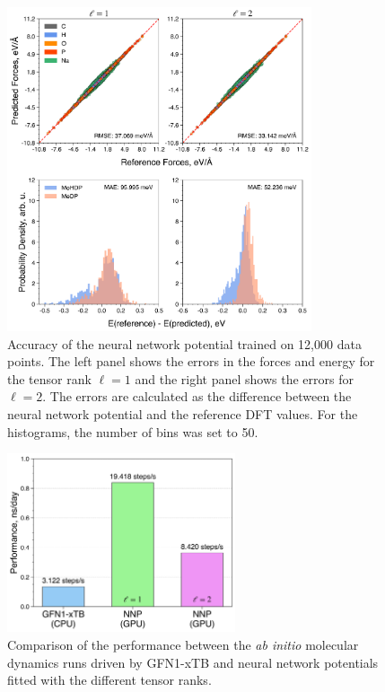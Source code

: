 \begin{figure}[ht]
    \centering
    \includegraphics[width=0.8\textwidth]{Figures/4_Results/results_nnp_accuracy_l-1_l-2.png}
    \caption{Accuracy of the neural network potential trained on 12,000 data points. The left panel shows the errors in the forces and energy for the tensor rank $\ell=1$ and the right panel shows the errors for $\ell=2$. The errors are calculated as the difference between the neural network potential and the reference DFT values. For the histograms, the number of bins was set to 50.}
    \label{fig:nnp_accuracy}
\end{figure}

\begin{figure}[ht]
    \centering
    \includegraphics[width=0.6\textwidth]{Figures/4_Results/results_performance_comparison.png}
    \caption{Comparison of the performance between the \textit{ab initio} molecular dynamics runs driven by GFN1-xTB and neural network potentials fitted with the different tensor ranks.}
    \label{fig:performance_comparison}
\end{figure}


